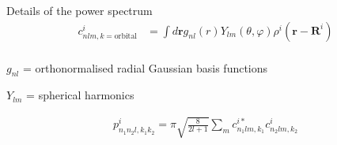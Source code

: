 \documentclass[xcolor=table,aspectratio=169]{beamer}
\numberwithin{equation}{section}
\begin{document}
\begin{frame}{Details of the power spectrum}
   \begin{align*}
      c^i_{nlm,k=\mathrm{orbital}} & =\int d\textbf{r} g_{nl}(r)Y_{lm}(\theta,\varphi)\rho^i(\textbf{r}-\textbf{R}^i) \\
   \end{align*}

   $g_{nl}$ = orthonormalised radial Gaussian basis functions

   $Y_{lm}$ = spherical harmonics

   \begin{align*}
      p^i_{n_1n_2l,k_1k_2}=\pi \sqrt{\frac{8}{2l+1}}\sum\limits_m {c_{n_1lm,k_1}^{i *}}c_{n_2lm,k_2}^i \label{eq: power spectrum}
   \end{align*}
\end{frame}
\end{document}

